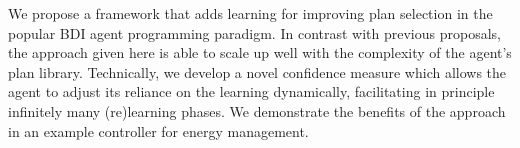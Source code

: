 

We propose a framework that adds learning for improving plan selection in the popular BDI agent programming paradigm.
%
In contrast with previous proposals, the approach given here is able to scale up well with the complexity of the agent's plan library.
%
Technically, we develop a novel confidence measure which allows the agent to adjust its reliance on the learning dynamically, facilitating in principle infinitely many (re)learning phases.
%
We demonstrate the benefits of the approach in an example controller for energy management.


%
%
%
%

